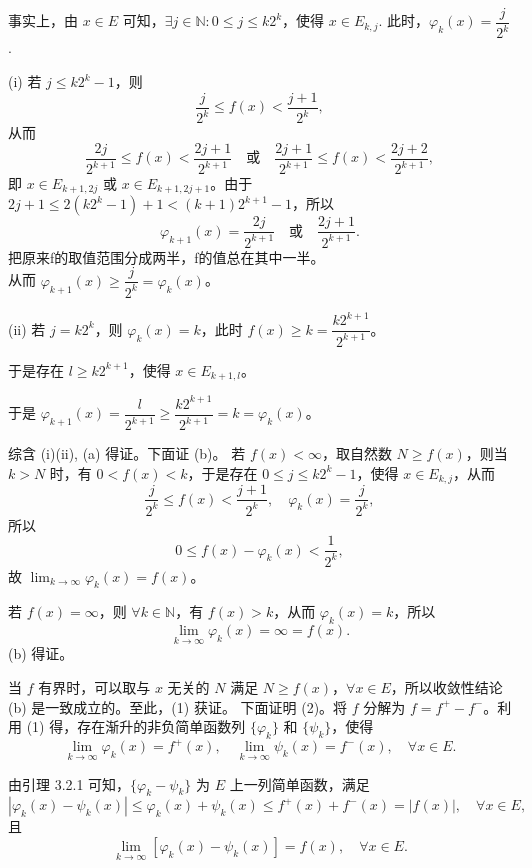 \documentclass[lang=cn,10pt]{elegantbook}
\begin{document}
事实上，由 $x \in E$ 可知，$\exists j \in \mathbb{N}: 0 \leq j \leq k2^k$，使得 $x \in E_{k,j}$. 此时，$\varphi_k(x) = \dfrac{j}{2^k}$.

(i) 若 $j \leq k2^k - 1$，则
\[
\frac{j}{2^k} \leq f(x) < \frac{j+1}{2^k},
\]
从而
\[
\frac{2j}{2^{k+1}} \leq f(x) < \frac{2j+1}{2^{k+1}} \quad \text{或} \quad \frac{2j+1}{2^{k+1}} \leq f(x) < \frac{2j+2}{2^{k+1}},
\]
即 $x \in E_{k+1,2j}$ 或 $x \in E_{k+1,2j+1}$。由于 $2j+1 \leq 2(k2^k - 1) + 1 < (k+1)2^{k+1} - 1$，所以
\[
\varphi_{k+1}(x) = \frac{2j}{2^{k+1}} \quad \text{或} \quad \frac{2j+1}{2^{k+1}}.
\]把原来f的取值范围分成两半，f的值总在其中一半。\\
从而 $\varphi_{k+1}(x) \geq \dfrac{j}{2^k} = \varphi_k(x)$。

(ii) 若 $j = k2^k$，则 $\varphi_k(x) = k$，此时 $f(x) \geq k = \dfrac{k2^{k+1}}{2^{k+1}}$。

于是存在 $l \geq k2^{k+1}$，使得 $x \in E_{k+1, l}$。

于是 $\varphi_{k+1}(x) = \dfrac{l}{2^{k+1}} \geq \dfrac{k2^{k+1}}{2^{k+1}} = k = \varphi_k(x)$。

综含 (i)(ii), (a) 得证。下面证 (b)。
若 $f(x)<\infty$，取自然数 $N \geq f(x)$，则当 $k > N$ 时，有 $0 < f(x) < k$，于是存在
$0 \leq j \leq k2^k -1$，使得 $x \in E_{k,j}$，从而
\[
\frac{j}{2^k} \leq f(x) < \frac{j+1}{2^k}, \quad \varphi_k(x) = \frac{j}{2^k},
\]
所以
\[
0 \leq f(x) - \varphi_k(x) < \frac{1}{2^k},
\]
故 $\lim_{k \to \infty} \varphi_k(x) = f(x)$。

若 $f(x) = \infty$，则 $\forall k \in \mathbb{N}$，有 $f(x) > k$，从而 $\varphi_k(x) = k$，所以
\[
\lim_{k \to \infty} \varphi_k(x) = \infty = f(x).
\]
(b) 得证。

当 $f$ 有界时，可以取与 $x$ 无关的 $N$ 满足 $N \geq f(x)$，$\forall x \in E$，所以收敛性结论 (b) 是一致成立的。至此，(1) 获证。
下面证明 (2)。将 $f$ 分解为 $f = f^+ - f^-$。利用 (1) 得，存在渐升的非负简单函数列 $\{\varphi_k\}$ 和 $\{\psi_k\}$，使得
\[
\lim_{k \to \infty} \varphi_k(x) = f^+(x), \quad \lim_{k \to \infty} \psi_k(x) = f^-(x), \quad \forall x \in E.
\]

由引理 3.2.1 可知，$\{\varphi_k - \psi_k\}$ 为 $E$ 上一列简单函数，满足
\[
|\varphi_k(x) - \psi_k(x)| \leq \varphi_k(x) + \psi_k(x) \leq f^+(x) + f^-(x) = |f(x)|, \quad \forall x \in E,
\]
且
\[
\lim_{k \to \infty} [\varphi_k(x) - \psi_k(x)] = f(x), \quad \forall x \in E.
\]
\end{document}
